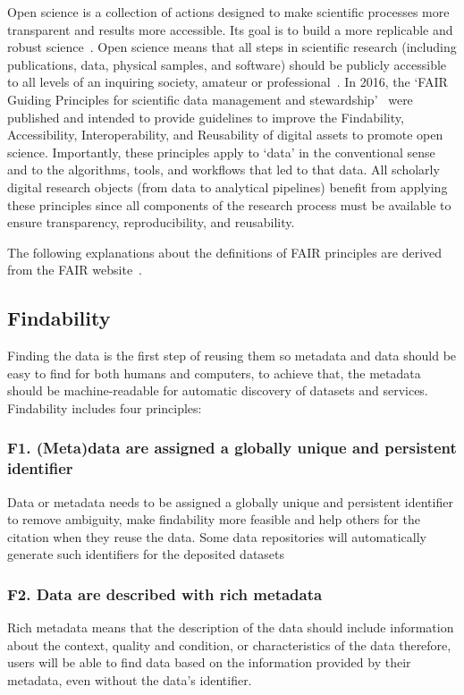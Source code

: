 Open science is a collection of actions designed to make scientific processes more transparent and results more accessible. Its goal is to build a more replicable and robust science~\cite{spellman_gilbert_corker_2017}. Open science means that all steps in scientific research (including publications, data, physical samples, and software) should be publicly accessible to all levels of an inquiring society, amateur or professional~\cite{woelfle2011open}. In 2016, the `FAIR Guiding Principles for scientific data management and stewardship'~\cite{wilkinson2016fair} were published and intended to provide guidelines to improve the Findability, Accessibility, Interoperability, and Reusability of digital assets to promote open science. Importantly, these principles apply to `data' in the conventional sense and to the algorithms, tools, and workﬂows that led to that data. All scholarly digital research objects (from data to analytical pipelines) beneﬁt from applying these principles since all components of the research process must be available to ensure transparency, reproducibility, and reusability.

The following explanations about the definitions of FAIR principles are derived from the FAIR website~\cite{FAIR_Principles}.  
\subsection*{Findability}
Finding the data is the first step of reusing them so metadata and data should be easy to find for both humans and computers, to achieve that, the metadata should be machine-readable for automatic discovery of datasets and services.
Findability includes four principles:
\subsubsection*{F1. (Meta)data are assigned a globally unique and persistent identifier}
Data or metadata needs to be assigned a globally unique and persistent identifier to remove ambiguity, make findability more feasible and help others for the citation when they reuse the data. Some data repositories will automatically generate such identifiers for the deposited datasets

\subsubsection*{F2. Data are described with rich metadata}
Rich metadata means that the description of the data should include information about the context, quality and condition, or characteristics of the data therefore, users will be able to find data based on the information provided by their metadata, even without the data's identifier.

